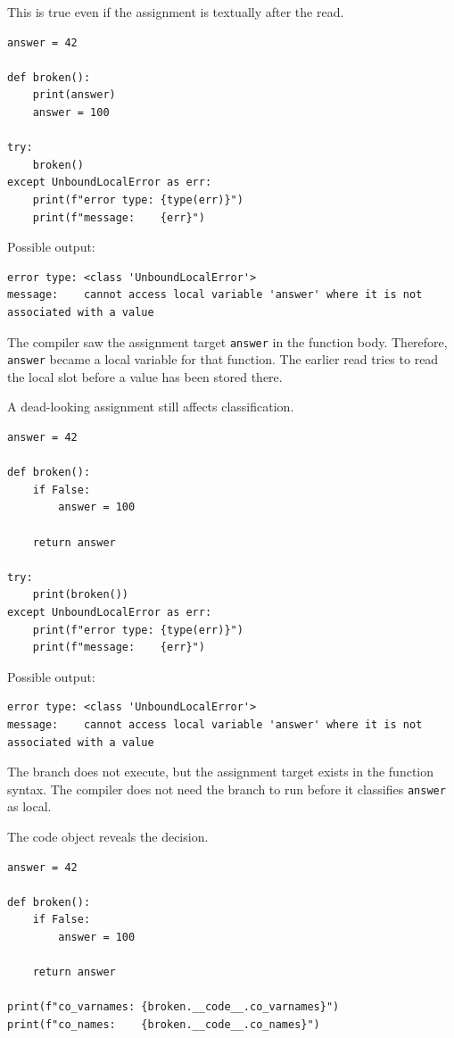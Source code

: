 This is true even if the assignment is textually after the read.

\begin{verbatim}
answer = 42

def broken():
    print(answer)
    answer = 100

try:
    broken()
except UnboundLocalError as err:
    print(f"error type: {type(err)}")
    print(f"message:    {err}")
\end{verbatim}

Possible output:

\begin{verbatim}
error type: <class 'UnboundLocalError'>
message:    cannot access local variable 'answer' where it is not associated with a value
\end{verbatim}

The compiler saw the assignment target \texttt{answer} in the function body. Therefore, \texttt{answer} became a local variable for that function. The earlier read tries to read the local slot before a value has been stored there.

A dead-looking assignment still affects classification.

\begin{verbatim}
answer = 42

def broken():
    if False:
        answer = 100

    return answer

try:
    print(broken())
except UnboundLocalError as err:
    print(f"error type: {type(err)}")
    print(f"message:    {err}")
\end{verbatim}

Possible output:

\begin{verbatim}
error type: <class 'UnboundLocalError'>
message:    cannot access local variable 'answer' where it is not associated with a value
\end{verbatim}

The branch does not execute, but the assignment target exists in the function syntax. The compiler does not need the branch to run before it classifies \texttt{answer} as local.

The code object reveals the decision.

\begin{verbatim}
answer = 42

def broken():
    if False:
        answer = 100

    return answer

print(f"co_varnames: {broken.__code__.co_varnames}")
print(f"co_names:    {broken.__code__.co_names}")
\end{verbatim}

